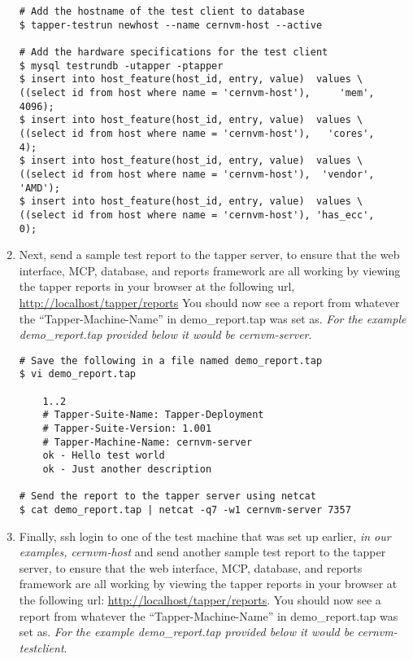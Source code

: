 \begin{enumerate}
\lstset{language=bash,caption= Adding Test Clients to Tapper Database}
\begin{lstlisting}
# Add the hostname of the test client to database
$ tapper-testrun newhost --name cernvm-host --active

# Add the hardware specifications for the test client
$ mysql testrundb -utapper -ptapper
$ insert into host_feature(host_id, entry, value)  values \
((select id from host where name = 'cernvm-host'),     'mem',  4096);
$ insert into host_feature(host_id, entry, value)  values \
((select id from host where name = 'cernvm-host'),   'cores',     4);
$ insert into host_feature(host_id, entry, value)  values \
((select id from host where name = 'cernvm-host'),  'vendor', 'AMD');
$ insert into host_feature(host_id, entry, value)  values \
((select id from host where name = 'cernvm-host'), 'has_ecc',     0);
\end{lstlisting}


\item 	Next, send a sample test report to the tapper server, to ensure that the web interface, MCP, database, and reports
		framework are all working by viewing the tapper reports in your browser at the following url, 
		\url{http://localhost/tapper/reports} You should now see a report from whatever the ``Tapper-Machine-Name'' in 
		demo\_report.tap was set as. \emph{For the example demo\_report.tap provided below it would be cernvm-server}.

\lstset{language=bash,caption= Send a Report from the \tapper~Server to Itself}
\begin{lstlisting}
# Save the following in a file named demo_report.tap
$ vi demo_report.tap

	1..2
	# Tapper-Suite-Name: Tapper-Deployment
	# Tapper-Suite-Version: 1.001
	# Tapper-Machine-Name: cernvm-server
	ok - Hello test world
	ok - Just another description

# Send the report to the tapper server using netcat
$ cat demo_report.tap | netcat -q7 -w1 cernvm-server 7357
\end{lstlisting}

\item 	Finally, ssh login to one of the test machine that was set up earlier, \emph{in our examples, cernvm-host} and send another 
		sample test report to the tapper server, to ensure that the web interface, MCP, database, and reports framework are all working 
		by viewing the tapper reports in your browser at the following url: \url{http://localhost/tapper/reports}. You should now see a 
		report from whatever the ``Tapper-Machine-Name'' in demo\_report.tap was set as. \emph{For the example demo\_report.tap provided 
		below it would be cernvm-testclient}.


\end{enumerate}
